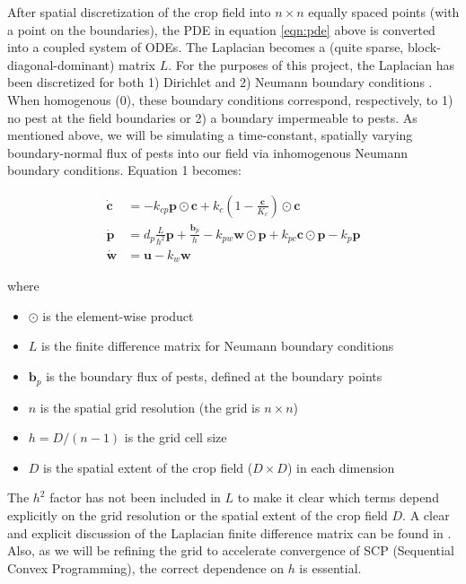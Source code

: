 \documentclass[11pt]{article}
\begin{document}
After spatial discretization of the crop field into $n \times n$ equally spaced points (with a point on the boundaries), the PDE in equation \ref{eqn:pde} above is converted into a coupled system of ODEs. The Laplacian becomes a (quite sparse, block-diagonal-dominant) matrix $L$. For the purposes of this project, the Laplacian has been discretized for both 1) Dirichlet and 2) Neumann boundary conditions \cite{R5}. When homogenous (0), these boundary conditions correspond, respectively, to 1) no pest at the field boundaries or 2) a boundary impermeable to pests. As mentioned above, we will be simulating a time-constant, spatially varying boundary-normal flux of pests into our field via inhomogenous Neumann boundary conditions. Equation 1 becomes:

\begin{align}
\dot{\bm{c}} &= -k_{cp} \bm{p} \odot \bm{c} + k_c \left( 1 - \frac{\bm{c}}{K_c} \right) \odot \bm{c} \nonumber \\ 
\dot{\bm{p}} &= d_p \frac{L}{h^2} \bm{p} + \frac{\bm{b}_p}{h} - k_{pw} \bm{w} \odot \bm{p} + k_{pc} \bm{c} \odot \bm{p} - k_p \bm{p} \\
\dot{\bm{w}} &= \bm{u} - k_w \bm{w} \nonumber
\end{align}

where

\begin{itemize}
\setlength\itemsep{-1pt}
\item $\odot$ is the element-wise product
\item $L$ is the finite difference matrix for Neumann boundary conditions
\item $\bm{b}_p$ is the boundary flux of pests, defined at the boundary points
\item $n$ is the spatial grid resolution (the grid is $n \times n$)
\item $h = D / (n-1)$ is the grid cell size
\item $D$ is the spatial extent of the crop field ($D \times D$) in each dimension
\end{itemize}

The $h^2$ factor has not been included in $L$ to make it clear which terms depend explicitly on the grid resolution or the spatial extent of the crop field $D$. A clear and explicit discussion of the Laplacian finite difference matrix can be found in \cite{R5}. Also, as we will be refining the grid to accelerate convergence of SCP (Sequential Convex Programming), the correct dependence on $h$ is essential.
\end{document}
